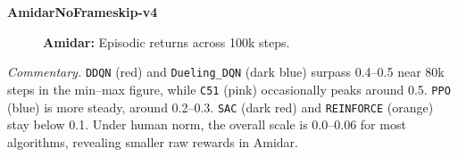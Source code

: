 \bigskip

\noindent
\textbf{AmidarNoFrameskip-v4}
\begin{figure} 
	\centering
	\quad
	\caption{\textbf{Amidar:} Episodic returns across 100k steps.}
	\label{fig:amidar_comparison_combined}
\end{figure}

\noindent
\emph{Commentary.} 
\texttt{DDQN} (red) and \texttt{Dueling\_DQN} (dark blue) surpass 0.4--0.5 near 80k steps 
in the min--max figure, while \texttt{C51} (pink) occasionally peaks around 0.5. 
\texttt{PPO} (blue) is more steady, around 0.2--0.3. \texttt{SAC} (dark red) 
and \texttt{REINFORCE} (orange) stay below 0.1. 
Under human norm, the overall scale is 0.0--0.06 for most algorithms, 
revealing smaller raw rewards in Amidar.

\bigskip

